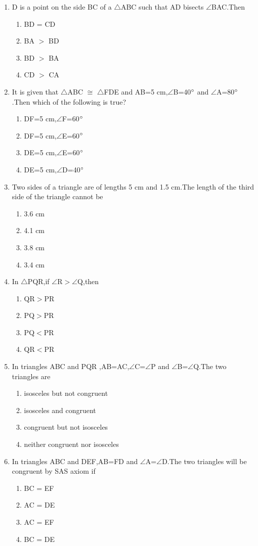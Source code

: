 \documentclass[12pt]{article}
\begin{document}
\begin{enumerate}
\item D is a point on the side BC of a $\triangle$ABC such that AD bisects $\angle$BAC.Then
\begin{enumerate}\item BD = CD \item BA $>$ BD \item BD $>$ BA \item CD $>$ CA\end{enumerate}
\item It is given that $\triangle$ABC $\cong$ $\triangle$FDE and AB=5 cm,$\angle$B=40$\degree$ and $\angle$A=80$\degree$.Then which of the following is true?
\begin{enumerate}
\item DF=5 cm,$\angle$F=60$\degree$  \item DF=5 cm,$\angle$E=60$\degree$
\item DE=5 cm,$\angle$E=60$\degree$  \item DE=5 cm,$\angle$D=40$\degree$
\end{enumerate}
\item Two sides of a triangle are of lengths 5 cm and 1.5 cm.The length of the third side of the triangle cannot be
\begin{enumerate}\item 3.6 cm \item 4.1 cm \item 3.8 cm \item 3.4 cm\end{enumerate}
\item In $\triangle$PQR,if $\angle$R$>$$\angle$Q,then
\begin{enumerate}\item QR$>$PR \item PQ$>$PR \item PQ$<$PR \item QR$<$PR\end{enumerate}
\item In triangles ABC and PQR ,AB=AC,$\angle$C=$\angle$P and $\angle$B=$\angle$Q.The two triangles are 
\begin{enumerate}
\item isosceles but not congruent \item isosceles and congruent
\item congruent but not isosceles \item neither congruent nor isosceles
\end{enumerate}
\item In triangles ABC and DEF,AB=FD and $\angle$A=$\angle$D.The two triangles will be congruent by SAS axiom if 
\begin{enumerate}\item BC = EF \item AC = DE \item AC = EF \item BC = DE\end{enumerate}
\end{enumerate}
\end{document}
